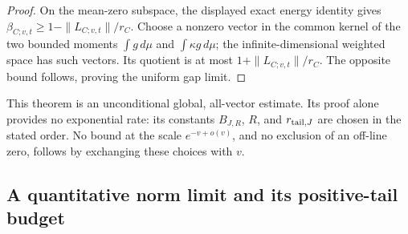 \documentclass[11pt]{article}
\theoremstyle{remark}\newtheorem{remark}[theorem]{Remark}
\begin{document}
\begin{proof}
On the mean-zero subspace, the displayed exact energy identity
gives \(\beta_{C;v,t}\ge1-\|L_{C;v,t}\|/r_C\).
Choose a nonzero vector in the common kernel of the two
bounded moments \(\int g\,d\mu\) and \(\int\kappa g\,d\mu\);
the infinite-dimensional weighted space has such vectors.
Its quotient is at most \(1+\|L_{C;v,t}\|/r_C\).
The opposite bound follows, proving the uniform gap limit.
\end{proof}

This theorem is an unconditional global, all-vector estimate.
Its proof alone provides no exponential rate: its constants
\(B_{J,R}\), \(R\), and \(r_{{\rm tail},J}\) are chosen in the
stated order. No bound at the scale \(e^{-v+o(v)}\), and no
exclusion of an off-line zero, follows by exchanging these
choices with \(v\).

\subsection{A quantitative norm limit and its positive-tail budget}
\end{document}

